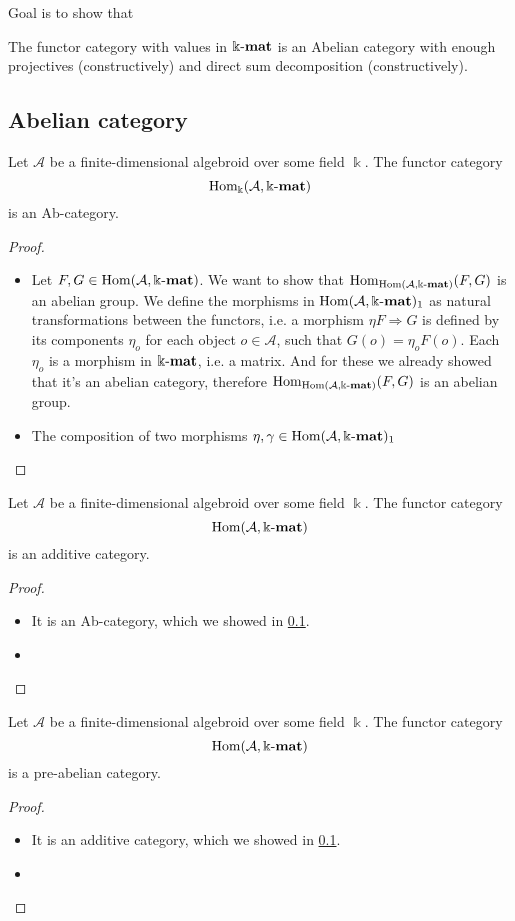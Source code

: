 Goal is to show that

The functor category with values in $\Bbbk\textnormal{-}\mathbf{mat}$ is an Abelian category with enough projectives (constructively) and direct sum decomposition (constructively).

\subsection{Abelian category}

\begin{lemma}
Let $\mathcal{A}$ be a finite-dimensional algebroid over some field $\Bbbk$. The functor category
\[
\mathrm{Hom_{\Bbbk}}(\mathcal{A},\Bbbk\textnormal{-}\mathbf{mat})
\]
is an Ab-category.
\begin{proof}
\begin{itemize}
\renewcommand{\labelenumi}{(\theenumi)}
\item Let $F, G \in \mathrm{Hom}(\mathcal{A},\Bbbk\textnormal{-}\mathbf{mat})$. We want to show that
$\mathrm{Hom}_{\mathrm{Hom}(\mathcal{A},\Bbbk\textnormal{-}\mathbf{mat})}(F,G)$ is an abelian group.
We define the morphisms in $\mathrm{Hom}(\mathcal{A},\Bbbk\textnormal{-}\mathbf{mat})_{1}$ as natural transformations
between the functors, i.e. a morphism $\eta F \Rightarrow G$ is defined by its components $\eta_{o}$ for each object $o \in \mathcal{A}$,
such that $G(o) = \eta_{o} F(o)$. Each $\eta_{o}$ is a morphism in $\Bbbk\textnormal{-}\mathbf{mat}$, i.e. a matrix. And for these we already
showed that it's an abelian category, therefore $\mathrm{Hom}_{\mathrm{Hom}(\mathcal{A},\Bbbk\textnormal{-}\mathbf{mat})}(F,G)$ is an abelian group.
\item The composition of two morphisms $\eta, \gamma \in \mathrm{Hom}(\mathcal{A},\Bbbk\textnormal{-}\mathbf{mat})_{1}$ 
\end{itemize}
\end{proof}
\end{lemma}

\begin{lemma}
Let $\mathcal{A}$ be a finite-dimensional algebroid over some field $\Bbbk$. The functor category
\[
\mathrm{Hom}(\mathcal{A},\Bbbk\textnormal{-}\mathbf{mat})
\]
is an additive category.
\begin{proof}
\begin{itemize}
\renewcommand{\labelenumi}{(\theenumi)}
\item It is an Ab-category, which we showed in \ref{}.
\item
\end{itemize}
\end{proof}
\end{lemma}

\begin{lemma}
Let $\mathcal{A}$ be a finite-dimensional algebroid over some field $\Bbbk$. The functor category
\[
\mathrm{Hom}(\mathcal{A},\Bbbk\textnormal{-}\mathbf{mat})
\]
is a pre-abelian category.
\begin{proof}
\begin{itemize}
\renewcommand{\labelenumi}{(\theenumi)}
\item It is an additive category, which we showed in \ref{}.
\item
\end{itemize}
\end{proof}
\end{lemma}

